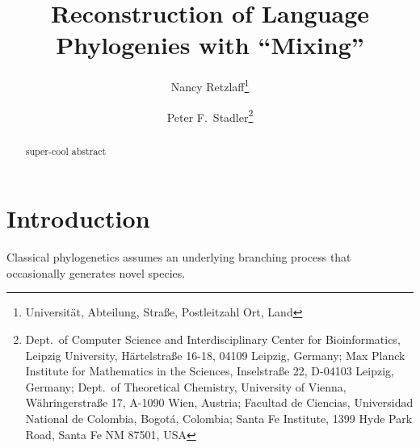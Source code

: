 \documentclass[amsmath]{lni}
\begin{document}
\title[Phylogenetics with Mixing Hybrids]{Reconstruction of Language
  Phylogenies with ``Mixing''}

\author[Nancy Retzlaff \and Peter F.\ Stadler] {Nancy
  Retzlaff\footnote{Universität, Abteilung, Straße, Postleitzahl Ort, Land
    }
  \and
%
  Peter F.\ Stadler\footnote{Dept.\ of Computer Science and
    Interdisciplinary Center for Bioinformatics, Leipzig University,
    H{\"a}rtelstra{\ss}e 16-18, 04109 Leipzig, Germany; Max Planck
    Institute for Mathematics in the Sciences, Inselstra{\ss}e 22, D-04103
    Leipzig, Germany; Dept.\ of Theoretical Chemistry, University of
    Vienna, W{\"a}hringerstra{\ss}e 17, A-1090 Wien, Austria; Facultad de
    Ciencias, Universidad National de Colombia, Bogot{\'a}, Colombia; Santa
    Fe Institute, 1399 Hyde Park Road, Santa Fe NM 87501, USA
    }
}
\maketitle


\begin{abstract}
  super-cool abstract
\end{abstract}


\section{Introduction}

Classical phylogenetics assumes an underlying branching process that
occasionally generates novel species. 
\end{document}
